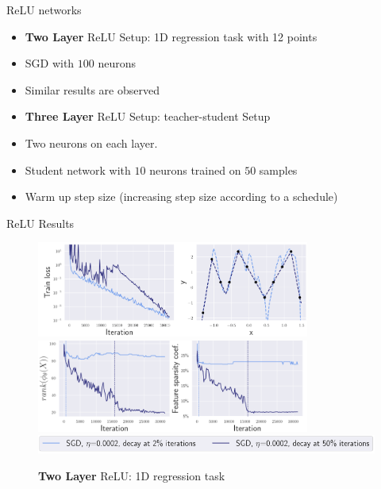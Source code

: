 \documentclass[fleqn]{beamer}
\begin{document}
    \begin{frame}{ReLU networks}
        \begin{itemize}
            \item \textbf{Two Layer} ReLU Setup: 1D regression task with 12 points
            \item SGD with $100$ neurons
            \item Similar results are observed
        \end{itemize}

        \begin{itemize}
            \item \textbf{Three Layer} ReLU Setup: teacher-student Setup
            \item Two neurons on each layer.
            \item Student network with $10$ neurons trained on $50$ samples
            \item Warm up step size (increasing step size according to a
                schedule)
        \end{itemize}
    \end{frame}

    \begin{frame}{ReLU Results}
        \begin{figure}[htpb]
            \centering
            \includegraphics[width=0.8\textwidth,
            height=0.4\textheight]{./pics/relu2_loss.png}
            \includegraphics[width=0.8\textwidth,
            height=0.4\textheight]{./pics/relu2_sparsity.png}
            \includegraphics[width=\textwidth]{./pics/relu2_setup.png}
            \caption{\textbf{Two Layer} ReLU: 1D regression task}
        \end{figure}
    \end{frame}
\end{document}
